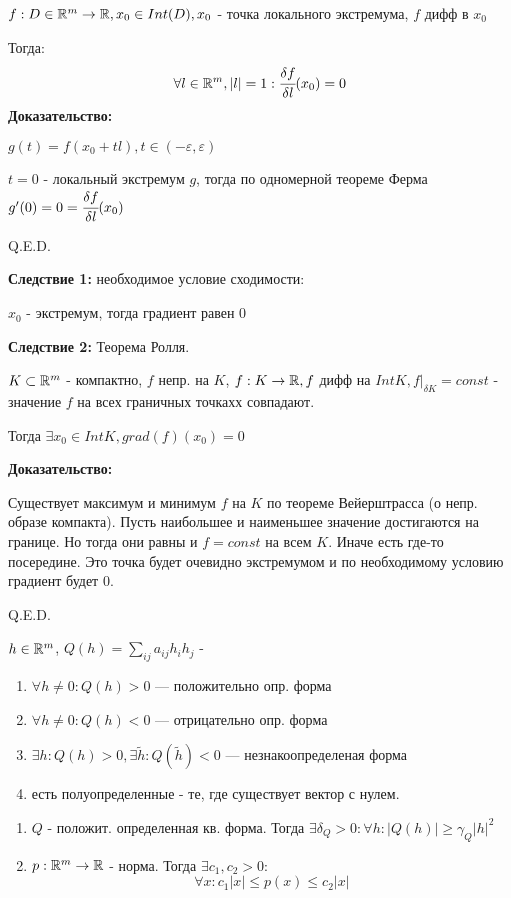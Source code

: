 
$f :D \in \mathbb{R}^m \rightarrow \mathbb{R}, x_0 \in Int(D), x_0$ - точка локального экстремума, $f$ дифф в $x_0$

Тогда:
$$\forall l \in \mathbb{R}^m, |l|=1 :\cfrac{\delta f}{\delta l}(x_0) = 0 $$
\textbf{Доказательство:}

$g(t) = f(x_0 + tl), t \in (-\varepsilon, \varepsilon)$

$t = 0$ - локальный экстремум $g$, тогда по одномерной теореме Ферма $g'(0) = 0 = \cfrac{\delta f}{\delta l}(x_0)$

\hfill Q.E.D.

\textbf{Следствие 1:} необходимое условие сходимости:

$x_0$ - экстремум, тогда градиент равен $0$

\textbf{Следствие 2:} Теорема Ролля.

$K \subset \mathbb{R}^m$ - компактно, $f$ непр. на $K$, $f: K \rightarrow \mathbb{R}, f$ дифф на  $Int K, f|_{\delta K} = const$ - значение $f$ на всех граничных точкахх совпадают.

Тогда  $\exists x_0 \in Int K, grad(f) (x_0) = 0$

\textbf{Доказательство:}

Существует максимум и минимум $f$  на $K$ по теореме Вейерштрасса (о непр. образе компакта).  Пусть наибольшее и наименьшее значение достигаются на границе. Но тогда они равны и $f = const$ на всем $K$. Иначе есть где-то посередине. Это точка будет очевидно экстремумом и по необходимому условию градиент будет $0$.

\hfill Q.E.D.

 $h \in \mathbb{R}^m$, $Q(h) = \sum\limits_{ij}a_{ij}h_ih_j$ - 

\begin{enumerate}
\item $\forall h \neq 0: Q(h) > 0$ --- положительно опр. форма
\item $\forall h \neq 0: Q(h) < 0$ --- отрицательно опр. форма
\item $\exists h: Q(h) > 0,  \exists \tilde{h}: Q(\tilde{h}) < 0$ --- незнакоопределеная форма
\item есть полуопределенные - те, где существует вектор с нулем.
\end{enumerate}

\begin{enumerate}
    \item  $Q$ - положит. определенная кв. форма. Тогда $\exists \delta_Q>0 : \forall h: |Q(h)|\geq \gamma_Q|h|^2$
    \item $p: \mathbb{R}^m \rightarrow \mathbb{R}$ - норма. Тогда $\exists c_1,c_2>0:$
    $$\forall x: c_1|x|\leq p(x)\leq c_2|x|$$
\end{enumerate}

